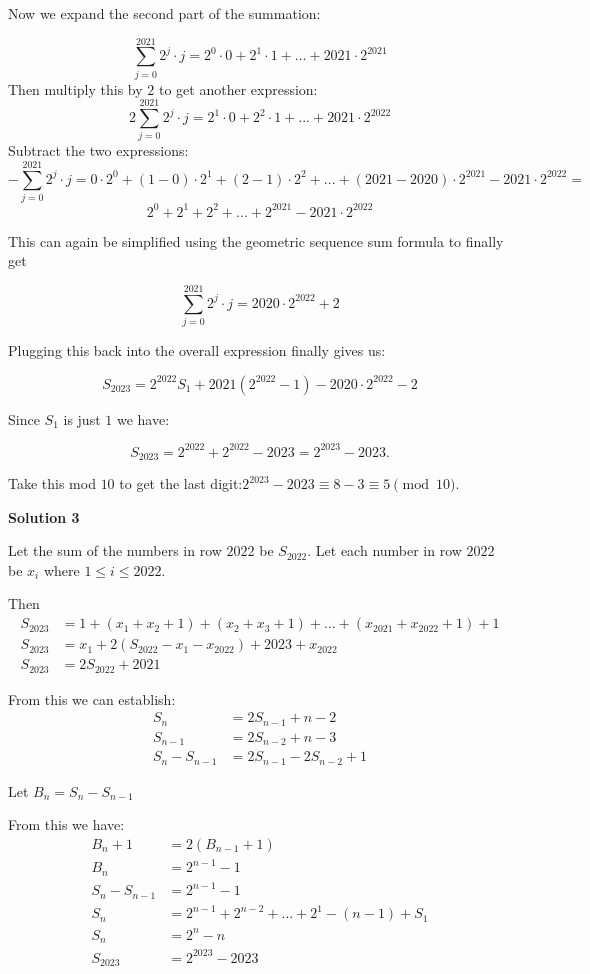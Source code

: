 \begin{enumerate}
 Now we expand the second part of the summation:

 
 \[\sum_{j=0}^{2021} 2^{j}\cdot j = 2^{0} \cdot 0 + 2^{1} \cdot 1 + ... + 2021 \cdot 2^{2021}\] Then multiply this by $2$ to get another expression:
 \[2\sum_{j=0}^{2021} 2^{j}\cdot j = 2^{1} \cdot 0 + 2^{2} \cdot 1 + ... + 2021 \cdot 2^{2022}\] Subtract the two expressions:
 \[-\sum_{j=0}^{2021} 2^{j}\cdot j = 0 \cdot 2^{0} + (1 - 0) \cdot 2^{1} + (2 - 1) \cdot 2^{2} + ... + (2021 - 2020)\cdot 2^{2021} - 2021 \cdot 2^{2022} =\]
 \[2^{0} + 2^{1} + 2^{2} + ... + 2^{2021} - 2021 \cdot 2^{2022}\]

 This can again be simplified using the geometric sequence sum formula to finally get

 
 \[\sum_{j=0}^{2021} 2^{j}\cdot j  = 2020\cdot2^{2022} + 2\] 

 Plugging this back into the overall expression finally gives us: 

 
 \[S_{2023} = 2^{2022}S_{1} + 2021(2^{2022} - 1) - 2020\cdot2^{2022} - 2\] 

 Since $S_{1}$ is just $1$ we have: 

 
 \[S_{2023} = 2^{2022} + 2^{2022} - 2023 = 2^{2023} - 2023.\] 

 Take this mod $10$ to get the last digit:$2^{2023} - 2023 \equiv 8 - 3 \equiv \boxed{5} \pmod{10}.$




\textbf{Solution 3}

Let the sum of the numbers in row $2022$ be $S_{2022}$. Let each number in row $2022$ be $x_i$ where $1 \leq i \leq 2022$. 

 Then 
 \begin{align*} S_{2023}&=1+(x_1+x_2+1)+(x_2+x_3+1)+...+(x_{2021}+x_{2022}+ 1)+1 \\ S_{2023}&=x_1+2(S_{2022}-x_1-x_{2022})+2023+x_{2022} \\ S_{2023} &= 2S_{2022} + 2021 \end{align*}


 From this we can establish:
 \begin{align*} S_n &= 2S_{n-1} + n-2 \\ S_{n-1} &= 2S_{n-2} + n-3 \\ S_n - S_{n-1} &= 2S_{n-1} - 2S_{n-2} + 1 \end{align*}


 Let $B_{n} =  S_n - S_{n-1}$

 From this we have:
 \begin{align*} B_n + 1 &= 2(B_{n-1} + 1) \\ B_n &= 2^{n-1} - 1 \\ S_n - S_{n-1} &= 2^{n-1} - 1 \\ S_n &= 2^{n-1} + 2^{n-2} + ... + 2^1 - (n-1) + S_1 \\ S_n &= 2^n - n \\ S_{2023} &= 2^{2023} - 2023 \end{align*}



\end{enumerate}
